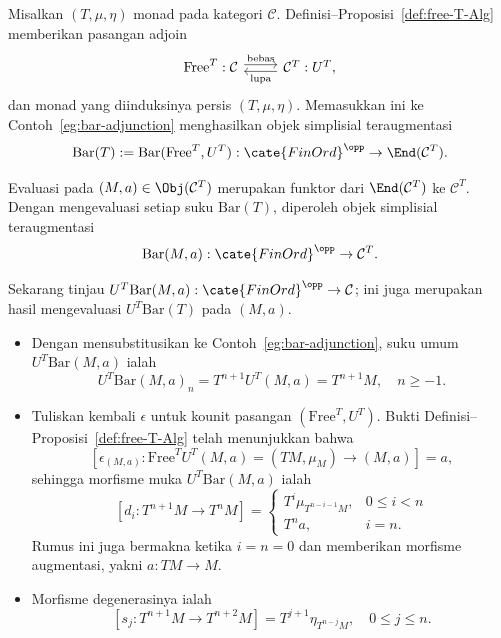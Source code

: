 \begin{example}\label{eg:bar-comonad}
	Misalkan $(T,\mu,\eta)$ monad pada kategori $\mathcal{C}$.
	Definisi--Proposisi~\ref{def:free-T-Alg} memberikan pasangan adjoin
	\[\begin{tikzcd}
		\mathrm{Free}^T : \mathcal{C} \arrow[shift left, r, "\text{bebas}"] & \mathcal{C}^T: U^T \arrow[shift left, l, "\text{lupa}"] ,
	\end{tikzcd}\]
	dan monad yang diinduksinya persis $(T,\mu,\eta)$. Memasukkan ini ke
	Contoh~\ref{eg:bar-adjunction} menghasilkan objek simplisial
	teraugmentasi
	\[ \mathrm{Bar}(T) := \mathrm{Bar}(\mathrm{Free}^T, U^T): \cate{FinOrd}^{\opp} \to \End(\mathcal{C}^T). \]

	Evaluasi pada $(M,a)\in\Obj(\mathcal{C}^T)$ merupakan funktor dari
	$\End(\mathcal{C}^T)$ ke $\mathcal{C}^T$. Dengan mengevaluasi setiap suku
	$\mathrm{Bar}(T)$,
	diperoleh objek simplisial teraugmentasi
	\[ \mathrm{Bar}(M, a): \cate{FinOrd}^{\opp} \to \mathcal{C}^T .\]

	Sekarang tinjau $U^T\mathrm{Bar}(M,a):\cate{FinOrd}^{\opp}\to
	\mathcal{C}$; ini juga merupakan hasil mengevaluasi
	$U^T\mathrm{Bar}(T)$ pada $(M,a)$.
	\begin{itemize}
		\item Dengan mensubstitusikan ke Contoh~\ref{eg:bar-adjunction},
		suku umum $U^T\mathrm{Bar}(M,a)$ ialah
		\[ U^T \mathrm{Bar}(M, a)_n = T^{n+1} U^T (M, a) = T^{n+1} M, \quad n \geq -1. \]
		\item Tuliskan kembali $\epsilon$ untuk kounit pasangan
		$(\mathrm{Free}^T,U^T)$. Bukti
		Definisi--Proposisi~\ref{def:free-T-Alg} telah menunjukkan bahwa
		\[ \left[ \epsilon_{(M, a)} : \mathrm{Free}^T U^T (M, a) = (TM, \mu_M) \to (M, a) \right] = a, \]
		sehingga morfisme muka $U^T\mathrm{Bar}(M,a)$ ialah
		\begin{equation*}
			\left[ d_i: T^{n+1}M \to T^n M \right] = \begin{cases}
				T^i \mu_{T^{n-i-1} M}, & 0 \leq i < n \\
				T^n a, & i = n.
			\end{cases}
		\end{equation*}
		Rumus ini juga bermakna ketika $i=n=0$ dan memberikan morfisme
		augmentasi, yakni $a:TM\to M$.
		\item Morfisme degenerasinya ialah
		\[ \left[ s_j: T^{n+1} M \to T^{n+2} M \right] =
		T^{j+1} \eta_{T^{n-j} M}, \quad 0 \leq j \leq n .\]
	\end{itemize}


\end{example}

